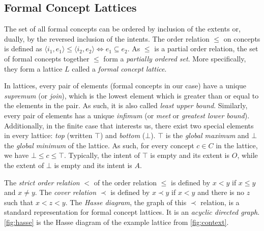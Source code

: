 \subsection{Formal Concept Lattices\label{sec:lattice}}
The set of all formal concepts can be ordered by inclusion of the extents or, dually, by the reversed inclusion of the intents.
The order relation $\leq$ on concepts is defined as $\langle i_1, e_1\rangle \leq \langle i_2, e_2\rangle \iff e_1 \subseteq e_2$.
As $\leq$ is a partial order relation, the set of formal concepts together $\leq$ form a \textit{partially ordered set}.
More specifically, they form a lattice $L$ called a \textit{formal concept lattice}.

In lattices, every pair of elements (formal concepts in our case) have a unique \textit{supremum} (or \textit{join}), which is the lowest element which is greater than or equal to the elements in the pair. As such, it is also called \textit{least upper bound}.
Similarly, every pair of elements has a unique \textit{infimum} (or \textit{meet} or \textit{greatest lower bound}).
Additionally, in the finite case that interests us, there exist two special elements in every lattice: \textit{top} (written $\top$) and \textit{bottom} ($\bot$).
$\top$ is the \textit{global maximum} and $\bot$ the \textit{global minimum} of the lattice.
As such, for every concept $c \in C$ in the lattice, we have $\bot \leq c \leq \top$.
Typically, the intent of $\top$ is empty and its extent is $O$, while the extent of $\bot$ is empty and its intent is $A$.

The \textit{strict order relation} $<$ of the order relation $\leq$ is defined by $x < y$ if $x \leq y$ and $x \neq y$.
The \textit{cover relation} $\prec$ is defined by $x \prec y$ if $x < y$ and there is no $z$ such that $x < z < y$.
The \textit{Hasse diagram}, the graph of this $\prec$ relation, is a standard representation for formal concept lattices.
It is an \textit{acyclic directed graph}.
\cref{fig:hasse} is the Hasse diagram of the example lattice from \cref{fig:context}.


